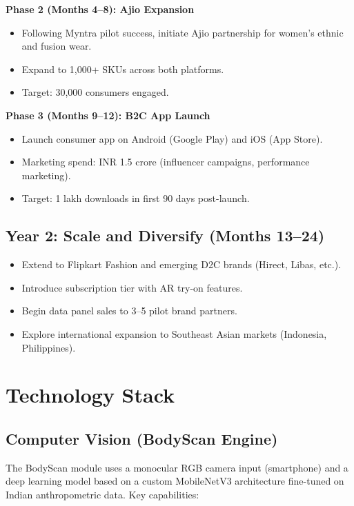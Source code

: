 \documentclass[12pt,a4paper]{article}
\begin{document}
\textbf{Phase 2 (Months 4--8): Ajio Expansion}
\begin{itemize}
    \item Following Myntra pilot success, initiate Ajio partnership for women's ethnic and fusion wear.
    \item Expand to 1,000+ SKUs across both platforms.
    \item Target: 30,000 consumers engaged.
\end{itemize}

\textbf{Phase 3 (Months 9--12): B2C App Launch}
\begin{itemize}
    \item Launch consumer app on Android (Google Play) and iOS (App Store).
    \item Marketing spend: INR 1.5 crore (influencer campaigns, performance marketing).
    \item Target: 1 lakh downloads in first 90 days post-launch.
\end{itemize}

\subsection{Year 2: Scale and Diversify (Months 13--24)}

\begin{itemize}
    \item Extend to Flipkart Fashion and emerging D2C brands (Hirect, Libas, etc.).
    \item Introduce subscription tier with AR try-on features.
    \item Begin data panel sales to 3--5 pilot brand partners.
    \item Explore international expansion to Southeast Asian markets (Indonesia, Philippines).
\end{itemize}

\section{Technology Stack}

\subsection{Computer Vision (BodyScan Engine)}

The BodyScan module uses a monocular RGB camera input (smartphone) and a deep learning model based on a custom MobileNetV3 architecture fine-tuned on Indian anthropometric data. Key capabilities:
\end{document}
